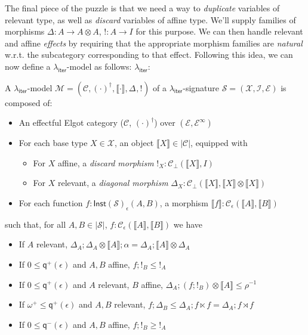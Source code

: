 \documentclass[acmsmall,screen,review]{acmart}
\newcommand{\mc}[1]{\ensuremath{\mathcal{#1}}}
\newcommand{\ms}[1]{\ensuremath{\mathsf{#1}}}
\newcommand{\dnt}[1]{\llbracket{#1}\rrbracket}
\newcommand{\tmor}[1]{{!}_{#1}}
\newcommand{\dmor}[1]{{\Delta}_{#1}}
\newcommand{\subiterexp}{\texorpdfstring{\(\lambda_{\ms{iter}}\)}{lambda-iter}}
\newcommand{\zeroq}{0}
\newcommand{\cpyq}{\omega^+}
\newcommand{\alquant}{\ms{q}}
\begin{document}
The final piece of the puzzle is that we need a way to \emph{duplicate} variables of relevant type,
as well as \emph{discard} variables of affine type. We'll supply families of morphisms $\Delta: A
\to A \otimes A$, $!: A \to I$ for this purpose. We can then handle relevant and affine
\emph{effects} by requiring that the appropriate morphism families are \emph{natural} w.r.t. the
subcategory corresponding to that effect. Following this idea, we can now define a \subiterexp-model
as follows: \subiterexp{}:
\begin{definition}[\subiterexp-model]
  A \subiterexp-model $\mc{M} = (\mc{C}, (\cdot)^\dagger, \dnt{\cdot}, \dmor{}, \tmor{})$ of a
  \subiterexp-signature $\mc{S} = (\mc{X}, \mc{I}, \mc{E})$ is composed of:
  \begin{itemize}
    \item An effectful Elgot category ($\mc{C}$, $(\cdot)^\dagger$) over $(\mc{E},
    \mc{E}^\infty)$
    \item For each base type $X \in \mc{X}$, an object $\dnt{X} \in |\mc{C}|$, equipped with
    \begin{itemize}
      \item For $X$ affine, a \emph{discard morphism} $\tmor{X} : \mc{C}_\bot(\dnt{X}, I)$
      \item For $X$ relevant, a \emph{diagonal morphism} $\dmor{X} : \mc{C}_\bot(\dnt{X}, \dnt{X}
      \otimes \dnt{X})$
    \end{itemize}
    \item For each function $f : \ms{Inst}(\mc{S})_\epsilon(A, B)$, a morphism $\dnt{f} :
    \mc{C}_\epsilon(\dnt{A}, \dnt{B})$
  \end{itemize}
  such that, for all $A, B \in |\mc{S}|$, $f : \mc{C}_\epsilon(\dnt{A}, \dnt{B})$ we have
  \begin{itemize}
    \item If $A$ relevant, 
      $\dmor{A} ; \dmor{A} \otimes \dnt{A} ; \alpha = \dmor{A} ; \dnt{A} \otimes \dmor{A}$
    \item If $\zeroq \leq \alquant^+(\epsilon)$ and $A, B$ affine, $f ; !_B \leq !_A$
    \item If $\zeroq \leq \alquant^+(\epsilon)$ and $A$ relevant, $B$ affine, 
      $\dmor{A} ; (f ; !_B) \otimes \dnt{A} \leq \rho^{-1}$
    \item If $\cpyq \leq \alquant^+(\epsilon)$ and $A, B$ relevant, 
    $f ; \dmor{B} \leq \dmor{A} ; f \ltimes f = \dmor{A} ; f \rtimes f$
    \item If $\zeroq \leq \alquant^-(\epsilon)$ and $A, B$ affine, $f ; !_B \geq !_A$

\end{itemize}
\end{definition}
\end{document}
